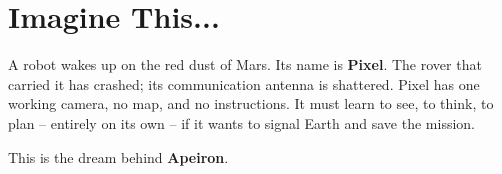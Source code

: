\section*{Imagine This...}

\begin{tcolorbox}[colback=black!3, colframe=black!40, title=\textbf{A Message from the Author}]
A robot wakes up on the red dust of Mars.  Its name is \textbf{Pixel}.
The rover that carried it has crashed; its communication antenna is
shattered.  Pixel has one working camera, no map, and no instructions.
It must learn to see, to think, to plan – entirely on its own – if it
wants to signal Earth and save the mission.

This is the dream behind \textbf{Apeiron}.
\end{tcolorbox}